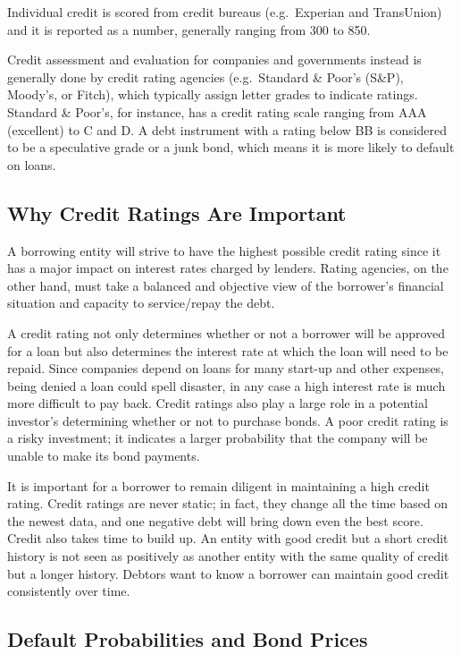Individual credit is scored from credit bureaus (e.g.~Experian and
TransUnion) and it is reported as a number, generally ranging from 300
to 850.

Credit assessment and evaluation for companies and governments instead
is generally done by credit rating agencies (e.g.~Standard \& Poor's
(S\&P), Moody's, or Fitch), which typically assign letter grades to
indicate ratings. Standard \& Poor's, for instance, has a credit rating
scale ranging from AAA (excellent) to C and D. A debt instrument with a
rating below BB is considered to be a speculative grade or a junk bond,
which means it is more likely to default on loans.

\subsection{Why Credit Ratings Are
Important}\label{why-credit-ratings-are-important}

A borrowing entity will strive to have the highest possible credit
rating since it has a major impact on interest rates charged by lenders.
Rating agencies, on the other hand, must take a balanced and objective
view of the borrower's financial situation and capacity to service/repay
the debt.

A credit rating not only determines whether or not a borrower will be
approved for a loan but also determines the interest rate at which the
loan will need to be repaid. Since companies depend on loans for many
start-up and other expenses, being denied a loan could spell disaster,
in any case a high interest rate is much more difficult to pay back.
Credit ratings also play a large role in a potential investor's
determining whether or not to purchase bonds. A poor credit rating is a
risky investment; it indicates a larger probability that the company
will be unable to make its bond payments.

It is important for a borrower to remain diligent in maintaining a high
credit rating. Credit ratings are never static; in fact, they change all
the time based on the newest data, and one negative debt will bring down
even the best score. Credit also takes time to build up. An entity with
good credit but a short credit history is not seen as positively as
another entity with the same quality of credit but a longer history.
Debtors want to know a borrower can maintain good credit consistently
over time.

\subsection{Default Probabilities and Bond
Prices}\label{default-probabilities-and-bond-prices}

